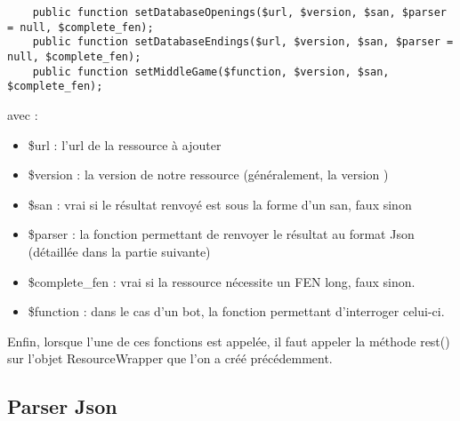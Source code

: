 \documentclass[a4paper,11pt]{article}
\begin{document}
\begin{lstlisting}
	public function setDatabaseOpenings($url, $version, $san, $parser = null, $complete_fen);
	public function setDatabaseEndings($url, $version, $san, $parser = null, $complete_fen);
	public function setMiddleGame($function, $version, $san, $complete_fen);
\end{lstlisting}
	
avec :

\begin{itemize}
	\item \$url : l'url de la ressource à ajouter
	\item \$version : la version de notre ressource (généralement, la version )
	\item \$san : vrai si le résultat renvoyé est sous la forme d'un san, faux sinon
	\item \$parser : la fonction permettant de renvoyer le résultat au format Json (détaillée dans la partie suivante)
	\item \$complete_fen : vrai si la ressource nécessite un FEN long, faux sinon.
	\item \$function : dans le cas d'un bot, la fonction permettant d'interroger celui-ci. 
\end{itemize}
Enfin, lorsque l'une de ces fonctions est appelée, il faut appeler la méthode rest() sur l'objet ResourceWrapper que l'on a créé précédemment.
	
\subsection{Parser Json}
	
 
	
        
\end{document}
